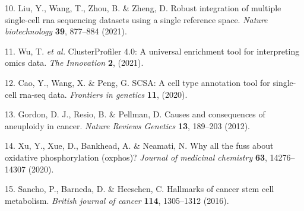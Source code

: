 \documentclass[
]{article}
\newenvironment{cslreferences}%
  {}%
  {\par}
\begin{document}
\begin{cslreferences}
\leavevmode\hypertarget{ref-RobustIntegratLiuY2021}{}%
10. Liu, Y., Wang, T., Zhou, B. \& Zheng, D. Robust integration of multiple single-cell rna sequencing datasets using a single reference space. \emph{Nature biotechnology} \textbf{39}, 877--884 (2021).

\leavevmode\hypertarget{ref-ClusterprofilerWuTi2021}{}%
11. Wu, T. \emph{et al.} ClusterProfiler 4.0: A universal enrichment tool for interpreting omics data. \emph{The Innovation} \textbf{2}, (2021).

\leavevmode\hypertarget{ref-ScsaACellTyCaoY2020}{}%
12. Cao, Y., Wang, X. \& Peng, G. SCSA: A cell type annotation tool for single-cell rna-seq data. \emph{Frontiers in genetics} \textbf{11}, (2020).

\leavevmode\hypertarget{ref-CausesAndConsGordon2012}{}%
13. Gordon, D. J., Resio, B. \& Pellman, D. Causes and consequences of aneuploidy in cancer. \emph{Nature Reviews Genetics} \textbf{13}, 189--203 (2012).

\leavevmode\hypertarget{ref-WhyAllTheFusXuYi2020}{}%
14. Xu, Y., Xue, D., Bankhead, A. \& Neamati, N. Why all the fuss about oxidative phosphorylation (oxphos)? \emph{Journal of medicinal chemistry} \textbf{63}, 14276--14307 (2020).

\leavevmode\hypertarget{ref-HallmarksOfCaSancho2016}{}%
15. Sancho, P., Barneda, D. \& Heeschen, C. Hallmarks of cancer stem cell metabolism. \emph{British journal of cancer} \textbf{114}, 1305--1312 (2016).
\end{cslreferences}
\end{document}
